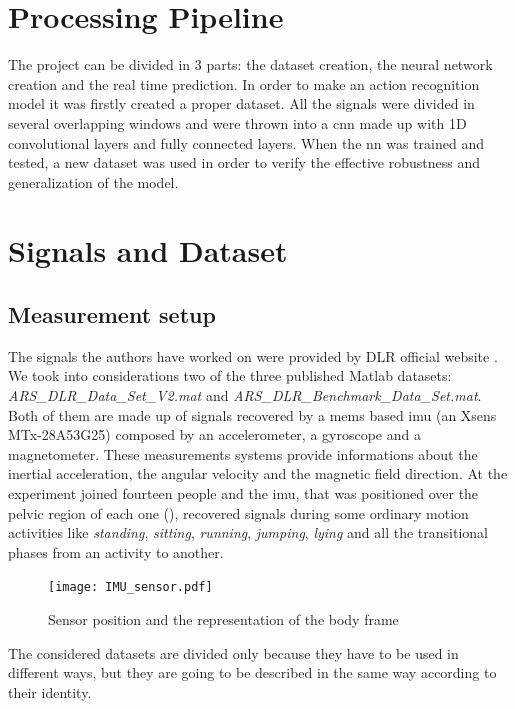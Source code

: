 
\section{Processing Pipeline}
\label{sec:processing_architecture}
The project can be divided in 3 parts: the dataset creation, the neural network creation and the real time prediction.
In order to make an action recognition model it was firstly created a proper dataset. All the signals were divided in several overlapping windows and were thrown into a \gls{cnn} made up with 1D convolutional layers and fully connected layers.
When the \gls{nn} was trained and tested, a new dataset was used in order to verify the effective robustness and generalization of the model. 


\section{Signals and Dataset}
\label{sec:model}

\subsection{Measurement setup}
The signals the authors have worked on were provided by DLR official website \cite{DLR}. We took into considerations two of the three published Matlab datasets: \textit{ARS\_DLR\_Data\_Set\_V2.mat} and \textit{ARS\_DLR\_Benchmark\_Data\_Set.mat}. 
Both of them are made up of signals recovered by a \gls{mems} based \gls{imu} (an Xsens MTx-28A53G25) composed by an accelerometer, a gyroscope and a magnetometer. These measurements systems provide informations about the inertial acceleration, the angular velocity and the magnetic field direction.
At the experiment joined fourteen people and the \gls{imu}, that was positioned over the pelvic region of each one (), recovered signals during some ordinary motion activities like \textit{standing}, \textit{sitting}, \textit{running}, \textit{jumping}, \textit{lying} and all the transitional phases from an activity to another.

\begin{figure}[htp]
\texttt{[image: IMU\_sensor.pdf]}
\caption{Sensor position and the representation of the body frame}
\label{fig:IMU}
\end{figure}

The considered datasets are divided only because they have to be used in different ways, but they are going to be described in the same way according to their identity.

